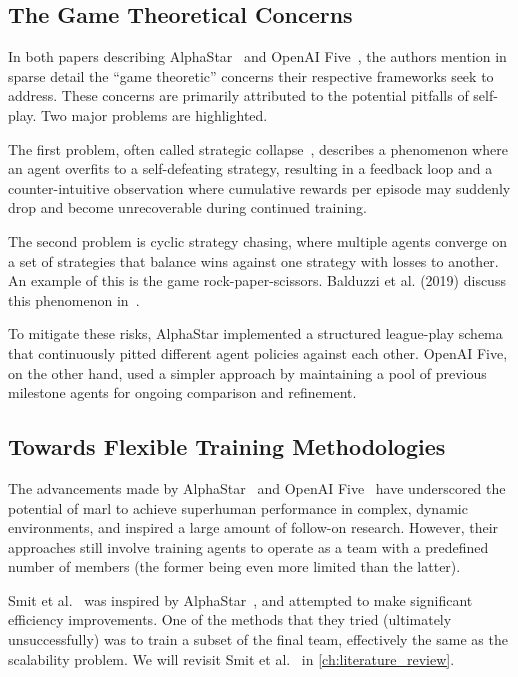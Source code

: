     \subsection*{The Game Theoretical Concerns}%

In both papers describing AlphaStar~\cite{vinyals2019} and OpenAI 
Five~\cite{berner2019}, the authors mention in sparse detail the 
``game theoretic'' concerns their respective frameworks seek to address. 
These concerns are primarily attributed to the potential pitfalls of self-play. 
Two major problems are highlighted.

The first problem, often called strategic 
collapse~\cite{berner2019,vinyals2019}, describes a phenomenon 
where an agent overfits to a self-defeating strategy, 
resulting in a feedback loop and a counter-intuitive observation where 
cumulative rewards per episode may suddenly drop and become unrecoverable 
during continued training.

The second problem is cyclic strategy chasing, where multiple agents 
converge on a set of strategies that balance wins against one strategy 
with losses to another. An example of this is the game rock-paper-scissors. 
Balduzzi et al. (2019) discuss this phenomenon in~\cite{balduzzi2019}.

To mitigate these risks, AlphaStar implemented a structured league-play 
schema that continuously pitted different agent policies against each other. 
OpenAI Five, on the other hand, used a simpler approach by maintaining a pool
of previous milestone agents for ongoing comparison and refinement.


    \subsection*{Towards Flexible Training Methodologies}

The advancements made by AlphaStar~\cite{vinyals2019} and 
OpenAI Five~\cite{berner2019} have underscored the potential of \gls{marl}
to achieve superhuman performance in complex, dynamic environments,
and inspired a large amount of follow-on research.
However, their approaches still involve training agents to 
operate as a team with a predefined number of members 
(the former being even more limited than the latter).

Smit et al.~\cite{smit2023} was inspired by AlphaStar~\cite{vinyals2019},
and attempted to make significant efficiency improvements.
One of the methods that they tried (ultimately unsuccessfully) was to train a 
subset of the final team, effectively the same as the scalability problem.
We will revisit Smit et al.~\cite{smit2023} in \cref{ch:literature_review}.

